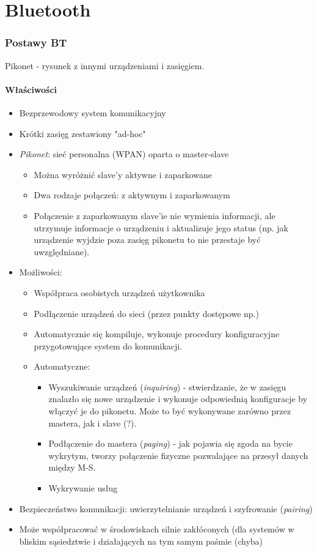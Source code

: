 \part{Bluetooth}
\section{Postawy BT}
Pikonet - rysunek z innymi urządzeniami i zasięgiem.
\subsection{Właściwości}
\begin{itemize}
	\item Bezprzewodowy system komunikacyjny
	\item Krótki zasięg zestawiony "ad-hoc"
	\item \textit{Pikonet}: sieć personalna (WPAN) oparta o master-slave
	\begin{itemize}
		\item Można wyróżnić slave'y aktywne i zaparkowane
		\item Dwa rodzaje połączeń: z aktywnym i zaparkowanym
		\item Połączenie z zaparkowanym slave'ie nie wymienia informacji, ale utrzymuje informacje o urządzeniu i aktualizuje jego status (np. jak urządzenie wyjdzie poza zasięg pikonetu to nie przestaje być uwzględniane).
	\end{itemize}
	\item Możliwości:
	\begin{itemize}
		\item Współpraca osobistych urządzeń użytkownika
		\item Podłączenie urządzeń do sieci (przez punkty dostępowe np.)
		\item Automatycznie się kompiluje, wykonuje procedury konfiguracyjne przygotowujące system do komunikacji.
		\item Automatyczne:
		\begin{itemize}
			\item Wyszukiwanie urządzeń (\emph{inquiring}) - stwierdzanie, że w zasięgu znalazło się nowe urządzenie i wykonuje odpowiednią konfiguracje by włączyć je do pikonetu. Może to być wykonywane zarówno przez mastera, jak i slave (?).
			\item Podłączenie do mastera (\emph{paging}) - jak pojawia się zgoda na bycie wykrytym, tworzy połączenie fizyczne pozwalające na przesył danych między M-S.
			\item Wykrywanie usług
		\end{itemize}
	\end{itemize}
	\item Bezpieczeństwo komunikacji: uwierzytelnianie urządzeń i szyfrowanie (\emph{pairing})
	\item Może współpracować w środowiskach silnie zakłóconych (dla systemów w bliskim sąsiedztwie i działających na tym samym paśmie (chyba)	
\end{itemize}
